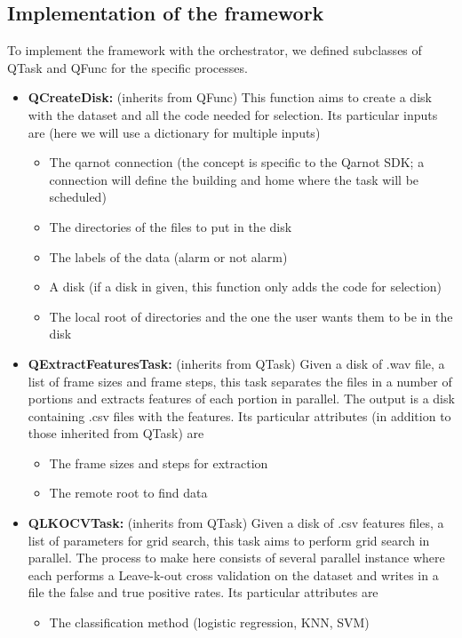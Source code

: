 \documentclass[10pt, conference, compsocconf]{IEEEtran}
\begin{document}
\subsection{Implementation of the framework}
To implement the framework with the orchestrator, we defined subclasses of QTask and QFunc for the specific processes.
\begin{itemize}
\item \textbf{QCreateDisk:} (inherits from QFunc) This function aims to create a disk with the dataset and all the code needed for selection.
  Its particular inputs are (here we will use a dictionary for multiple inputs)
  \begin{itemize}
  \item The qarnot connection (the concept is specific to the Qarnot SDK; a connection will define the building and home where the task will be scheduled)
  \item The directories of the files to put in the disk
  \item The labels of the data (alarm or not alarm)
  \item A disk (if a disk in given, this function only adds the code for selection)
  \item The local root of directories and the one the user wants them to be in the disk
  \end{itemize}
\item \textbf{QExtractFeaturesTask:} (inherits from QTask) Given a disk of .wav file, a list of frame sizes and frame steps, this task separates the files in a number of portions and extracts features of each portion in parallel. The output is a disk containing .csv files with the features.
  Its particular attributes (in addition to those inherited from QTask) are
  \begin{itemize}
  \item The frame sizes and steps for extraction
  \item The remote root to find data
  \end{itemize}
\item \textbf{QLKOCVTask:} (inherits from QTask) Given a disk of .csv features files, a list of parameters for grid search, this task aims to perform grid search in parallel. The process to make here consists of several parallel instance where each performs a Leave-k-out cross validation on the dataset and writes in a file the false and true positive rates.
  Its particular attributes are
  \begin{itemize}
  \item The classification method (logistic regression, KNN, SVM)

\end{itemize}
\end{itemize}
\end{document}
